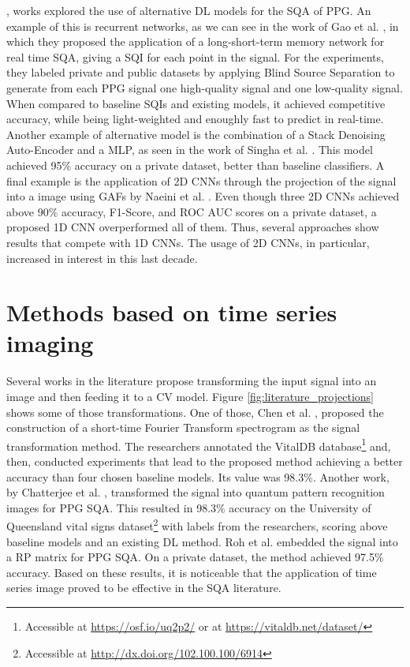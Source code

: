 , works explored the use of alternative \gls{DL} models for the \gls{SQA} of \gls{PPG}. An example of this is recurrent networks, as we can see in the work of Gao et al. \cite{deep-learning-4}, in which they proposed the application of a long-short-term memory network for real time \gls{SQA}, giving a \gls{SQI} for each point in the signal. For the experiments, they labeled private and public datasets by applying Blind Source Separation to generate from each \gls{PPG} signal one high-quality signal and one low-quality signal. When compared to baseline \gls{SQI}s and existing models, it achieved competitive accuracy, while being light-weighted and enoughly fast to predict in real-time. Another example of alternative model is the combination of a Stack Denoising Auto-Encoder and a \gls{MLP}, as seen in the work of Singha et al. \cite{deep-learning-5}. This model achieved 95\% accuracy on a private dataset, better than baseline classifiers. A final example is the application of 2D \glspl{CNN} through the projection of the signal into a image using \glspl{GAF} by Naeini et al. \cite{deep-learning-6}. Even though three 2D \glspl{CNN} achieved above 90\% accuracy, F1-Score, and \gls{ROC AUC} scores on a private dataset, a proposed 1D \gls{CNN} overperformed all of them. Thus, several approaches show results that compete with 1D \glspl{CNN}. The usage of 2D \glspl{CNN}, in particular, increased in interest in this last decade.


\section{Methods based on time series imaging}
\label{sec:imaging}

Several works in the literature propose transforming the input signal into an image and then feeding it to a \gls{CV} model. Figure \ref{fig:literature_projections} shows some of those transformations.  One of those, Chen et al. \cite{imaging-1}, proposed the construction of a short-time Fourier Transform spectrogram as the signal transformation method. The researchers annotated the VitalDB database\footnote{Accessible at \url{https://osf.io/uq2p2/} or at \url{https://vitaldb.net/dataset/}} \cite{vitaldb-dataset} and, then, conducted experiments that lead to the proposed method achieving a better accuracy than four chosen baseline models. Its value was 98.3\%. Another work, by Chatterjee et al. \cite{imaging-2}, transformed the signal into quantum pattern recognition images for PPG \gls{SQA}. This resulted in 98.3\% accuracy on the University of Queensland vital signs dataset\footnote{Accessible at \url{http://dx.doi.org/102.100.100/6914}} \cite{queensland-dataset} with labels from the researchers, scoring above baseline models and an existing \gls{DL} method. Roh et al. \cite{imaging-3} embedded the signal into a \gls{RP} matrix for PPG \gls{SQA}. On a private dataset, the method achieved 97.5\% accuracy. Based on these results, it is noticeable that the application of time series image proved to be effective in the \gls{SQA} literature.

